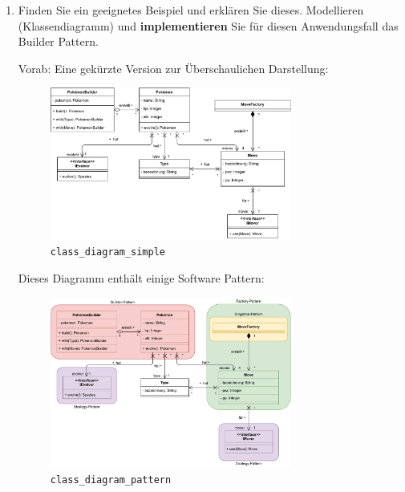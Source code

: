 \documentclass{article}
\begin{document}
\begin{enumerate}[label=\alph*.]
            Also wenn man Objekte mit beliebig vielen, gleichartigen und optionalen Parametern im Konstruktor hat, welche kompliziert zu erstellen sind oder man die Integrität unter allen Umständen beibehalten möchte und die absolute Korrektheit des Objekts unentbehrlich wichtig ist, ist das Nutzen des Builder Patterns sinnvoll\footnote{wenn man in einer veralteten schlechten Programmiersprache schreibt. z.B. Java}.

        \newpage
        \item Finden Sie ein geeignetes Beispiel und erklären Sie dieses.
            Modellieren (Klassendiagramm) und \textbf{implementieren} Sie für diesen Anwendungsfall das Builder Pattern.

            Vorab: Eine gekürzte Version zur Überschaulichen Darstellung:
            \begin{figure}[ht]
                \centering
                \includegraphics[width=0.75\textwidth]{swt_wende_tim_h09_class_diagram_simple.pdf}
                \caption{\texttt{class\_diagram\_simple}}
            \end{figure}

            Dieses Diagramm enthält einige Software Pattern:
            \begin{figure}[ht]
                \centering
                \includegraphics[width=0.75\textwidth]{swt_wende_tim_h09_class_diagram_pattern.pdf}
                \caption{\texttt{class\_diagram\_pattern}}
            \end{figure}


\end{enumerate}
\end{document}
